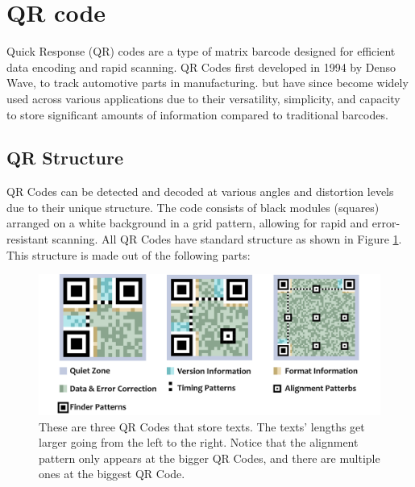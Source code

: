 \section{QR code}
Quick Response (QR) codes are a type of matrix barcode designed for efficient data encoding and rapid scanning. QR Codes first developed in 1994 by Denso Wave, to track automotive parts in manufacturing. but have since become widely used across various applications due to their versatility, simplicity, and capacity to store significant amounts of information compared to traditional barcodes.

\subsection{QR Structure}
QR Codes can be detected and decoded at various angles and distortion levels due to their unique structure. The code consists of black modules (squares) arranged on a white background in a grid pattern, allowing for rapid and error-resistant scanning. All QR Codes have standard structure as shown in Figure \ref{QR_code_structure}. This structure
is made out of the following parts:

\begin{figure}[h] %
	\centering
	\includegraphics[width=\textwidth]{assets/ch2/QR Codes Figure.png}
	\caption{ These are three QR Codes that store texts. The texts’ lengths get larger going from the left to the right. Notice that the alignment pattern only appears at the bigger QR Codes, and there are multiple ones at the biggest QR Code.}
	\label{QR_code_structure}
\end{figure}

